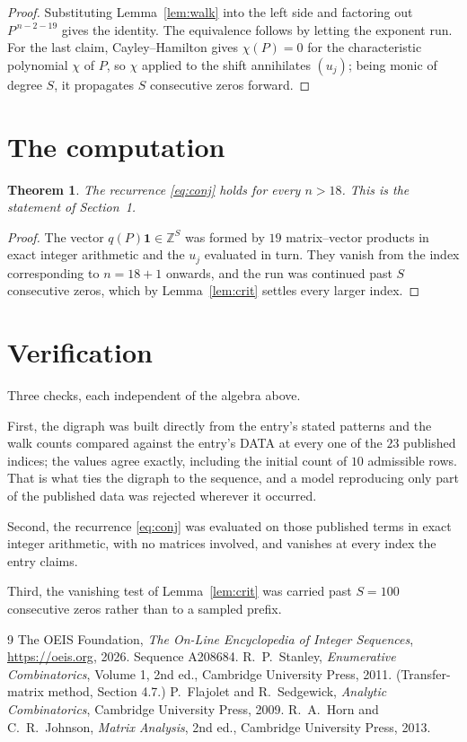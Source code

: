 \documentclass[11pt,a4paper]{article}
\theoremstyle{plain}
\newtheorem{theorem}{Theorem}
\theoremstyle{definition}
\begin{document}
\begin{proof}
Substituting Lemma~\ref{lem:walk} into the left side and factoring out
$P^{\,n-2-19}$ gives the identity. The equivalence follows by letting the exponent
run. For the last claim, Cayley--Hamilton gives $\chi(P)=0$ for the characteristic
polynomial $\chi$ of $P$, so $\chi$ applied to the shift annihilates $(u_j)$; being monic of
degree $S$, it propagates $S$ consecutive zeros forward.
\end{proof}

\section{The computation}

\begin{theorem}
The recurrence \eqref{eq:conj} holds for every $n>18$. This is the statement of
Section~1.
\end{theorem}

\begin{proof}
The vector $q(P)\mathbf{1}\in\mathbb{Z}^{S}$ was formed by $19$ matrix--vector
products in exact integer arithmetic and the $u_j$ evaluated in turn. They vanish from the
index corresponding to $n=18+1$ onwards, and the run was continued past $S$ consecutive
zeros, which by Lemma~\ref{lem:crit} settles every larger index.
\end{proof}

\section{Verification}

Three checks, each independent of the algebra above.

First, the digraph was built directly from the entry's stated patterns and the walk counts
compared against the entry's DATA at every one of the $23$ published indices; the
values agree exactly, including the initial count of $10$ admissible rows. That is
what ties the digraph to the sequence, and a model reproducing only part of the published
data was rejected wherever it occurred.

Second, the recurrence \eqref{eq:conj} was evaluated on those published terms in exact
integer arithmetic, with no matrices involved, and vanishes at every index the entry claims.

Third, the vanishing test of Lemma~\ref{lem:crit} was carried past $S=100$ consecutive
zeros rather than to a sampled prefix.

\begin{thebibliography}{9}
 The OEIS Foundation, \emph{The On-Line Encyclopedia of Integer
Sequences}, \url{https://oeis.org}, 2026. Sequence A208684.
 R.~P.~Stanley, \emph{Enumerative Combinatorics}, Volume 1, 2nd ed.,
Cambridge University Press, 2011. (Transfer-matrix method, Section 4.7.)
 P.~Flajolet and R.~Sedgewick, \emph{Analytic Combinatorics}, Cambridge
University Press, 2009.
 R.~A.~Horn and C.~R.~Johnson, \emph{Matrix Analysis}, 2nd ed., Cambridge
University Press, 2013.
\end{thebibliography}
\end{document}
